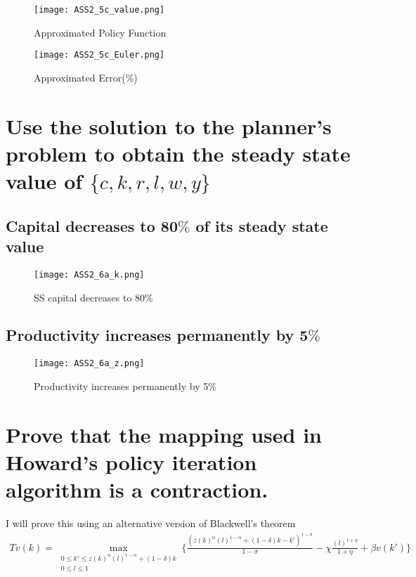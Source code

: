 \documentclass[12pt,a4paper]{article}
\begin{document}
\begin{figure}[!htbp]
\centering
  \texttt{[image: ASS2\_5c\_value.png]}
  \caption{Approximated Policy Function}
  \label{fig:boat1}
\end{figure}

\begin{figure}[!htbp]
\centering
  \texttt{[image: ASS2\_5c\_Euler.png]}
  \caption{Approximated Error($\%$)}
  \label{fig:boat1}
\end{figure}
\pagebreak

\section{Use the solution to the planner’s problem to obtain the steady state value of $\{c, k, r,l,w, y\}$}
\subsection{Capital decreases to 80$\%$ of its steady state value}
\begin{figure}[!htbp]
\centering
  \texttt{[image: ASS2\_6a\_k.png]}
  \caption{SS capital decreases to 80$\%$ }
  \label{fig:boat1}
\end{figure}

\subsection{Productivity increases permanently by 5$\%$}
\begin{figure}[!htbp]
\centering
  \texttt{[image: ASS2\_6a\_z.png]}
  \caption{Productivity increases permanently by 5$\%$ }
  \label{fig:boat1}
\end{figure}

\section{Prove that the mapping used in Howard’s policy iteration algorithm is a contraction.}
I will prove this using an alternative version of Blackwell’s theorem\\
\begin{equation}
\begin{split}
Tv(k) = \max\limits_{\begin{smallmatrix}0\leq k' \leq z(k)^{\alpha}(l)^{1-\alpha}+ (1-\delta)k\\ 0\leq l \leq 1\end{smallmatrix}} \{\frac{(z(k)^{\alpha}(l)^{1-\alpha}+ (1-\delta)k-k')^{1-\sigma}}{1-\sigma}-\chi \frac{(l)^{1+\eta}}{1+\eta}+\beta v(k')\}
\end{split}
\end{equation}
\end{document}

